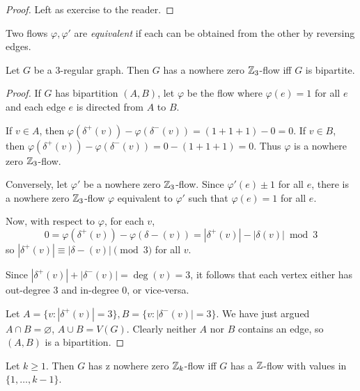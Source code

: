 \documentclass[main.tex]{subfiles}
\begin{document}
\begin{proof}
  Left as exercise to the reader.
\end{proof}
Two flows $\varphi, \varphi'$ are \textit{equivalent} if each can be obtained
from the other by reversing edges.
\begin{proposition*}
  Let $G$ be a 3-regular graph.
  Then $G$ has a nowhere zero $\mathbb Z_3$-flow iff $G$ is bipartite.
\end{proposition*}
\begin{proof}
  If $G$ has bipartition $(A,B)$, let $\varphi$ be the flow where
  $\varphi(e) = 1$ for all $e$ and each edge $e$ is directed from $A$ to $B$.

  If $v\in A$, then $\varphi(\delta^+(v)) - \varphi(\delta^-(v)) = (1 + 1 + 1) - 0 = 0$.
  If $v\in B$, then $\varphi(\delta^+(v)) - \varphi(\delta^-(v)) = 0 - (1+1+1) = 0$.
  Thus $\varphi$ is a nowhere zero $\mathbb Z_3$-flow.

  Conversely, let $\varphi'$ be a nowhere zero $\mathbb Z_3$-flow.
  Since $\varphi'(e)  \pm 1$ for all $e$, there is a nowhere zero $\mathbb Z_3$-flow
  $\varphi$ equivalent to $\varphi'$ such that $\varphi(e) = 1$ for all $e$.

  Now, with respect to $\varphi$, for each $v$,
  \[
    0 = \varphi(\delta^+(v)) - \varphi(\delta-(v)) = |\delta^+(v)| - |\delta(v)|\bmod 3
  \]
  so $|\delta^+(v)|\equiv|\delta-(v)|\pmod 3$ for all $v$.

  Since $|\delta^+(v)| + |\delta^-(v)| = \deg(v) = 3$, it follows that each
  vertex either has out-degree 3 and in-degree 0, or vice-versa.

  Let $A = \{v : |\delta^+(v)| = 3\}, B = \{v : |\delta^-(v)| = 3\}$.
  We have just argued $A\cap B = \varnothing$, $A\cup B = V(G)$.
  Clearly neither $A$ nor $B$ contains an edge, so $(A,B)$ is a bipartition.
\end{proof}
\begin{theorem}[Tutte]
  Let $k\geq 1$.
  Then $G$ has z nowhere zero $\mathbb Z_k$-flow iff $G$ has a $\mathbb Z$-flow with values
  in $\{1,\ldots,k-1\}$.
\end{theorem}
\end{document}
